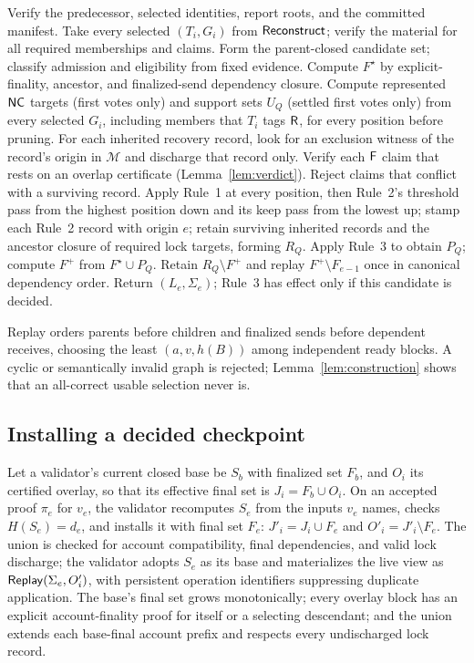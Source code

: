 \begin{algorithm}[t]
\caption{$\Build(S_{e-1},Q,\mathcal M)$}
\label{alg:build}
\small
\begin{algorithmic}[1]
\State Verify the predecessor, selected identities, report roots, and the committed manifest.
\State Take every selected $(T_i,G_i)$ from $\mathsf{Reconstruct}$; verify the material for all required memberships and claims.
\State Form the parent-closed candidate set; classify admission and eligibility from fixed evidence.
\State Compute $F^\star$ by explicit-finality, ancestor, and finalized-send dependency closure.
\State Compute represented $\mathsf{NC}$ targets (first votes only) and support sets $U_Q$ (settled first votes only) from every selected $G_i$, including members that $T_i$ tags $\mathsf{R}$, for every position before pruning.
\State For each inherited recovery record, look for an exclusion witness of the record's origin in $\mathcal M$ and discharge that record only. Verify each $\mathsf{F}$ claim that rests on an overlap certificate (Lemma~\ref{lem:verdict}). Reject claims that conflict with a surviving record.
\State Apply Rule~1 at every position, then Rule~2's threshold pass from the highest position down and its keep pass from the lowest up; stamp each Rule~2 record with origin $e$; retain surviving inherited records and the ancestor closure of required lock targets, forming $R_Q$.
\State Apply Rule~3 to obtain $P_Q$; compute $F^+$ from $F^\star\cup P_Q$.
\State Retain $R_Q\setminus F^+$ and replay $F^+\setminus F_{e-1}$ once in canonical dependency order.
\State Return $(L_e,\Sigma_e)$; Rule~3 has effect only if this candidate is decided.
\end{algorithmic}
\end{algorithm}

Replay orders parents before children and finalized sends before dependent receives, choosing the least $(a,v,h(B))$ among independent ready blocks. A cyclic or semantically invalid graph is rejected; Lemma~\ref{lem:construction} shows that an all-correct usable selection never is.

\subsection{Installing a decided checkpoint}
\label{sec:install}
Let a validator's current closed base be $S_b$ with finalized set $F_b$, and $O_i$ its certified overlay, so that its effective final set is $J_i=F_b\cup O_i$. On an accepted proof $\pi_e$ for $v_e$, the validator recomputes $S_e$ from the inputs $v_e$ names, checks $H(S_e)=d_e$, and installs it with final set $F_e$: $J'_i=J_i\cup F_e$ and $O'_i=J'_i\setminus F_e$. The union is checked for account compatibility, final dependencies, and valid lock discharge; the validator adopts $S_e$ as its base and materializes the live view as $\mathsf{Replay}(\Sigma_e,O'_i)$, with persistent operation identifiers suppressing duplicate application. The base's final set grows monotonically; every overlay block has an explicit account-finality proof for itself or a selecting descendant; and the union extends each base-final account prefix and respects every undischarged lock record.

